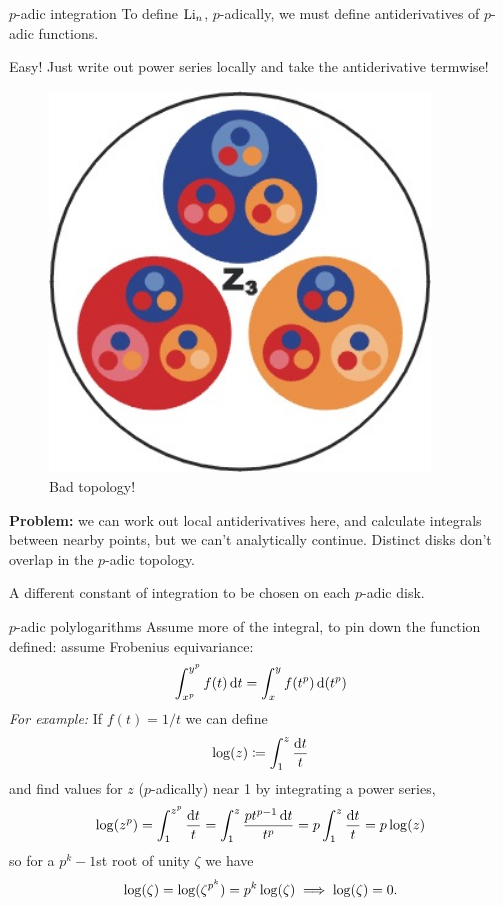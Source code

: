 \begin{frame}{$p$-adic integration}
    To define $\operatorname{Li}_n$, $p$-adically, we must define antiderivatives of $p$-adic functions.

    Easy! Just write out power series locally and take the antiderivative termwise!

    \begin{figure}
        \includegraphics[width=0.9\textwidth]{padic.jpg}
        \caption*{Bad topology!}
    \end{figure}
    \textbf{Problem:} we can work out local antiderivatives here, and calculate integrals between nearby points, but we can't analytically continue. Distinct disks don't overlap in the $p$-adic topology.
    
    A different constant of integration to be chosen on each $p$-adic disk.
\end{frame}


\begin{frame}{$p$-adic polylogarithms}
    Assume more of the integral, to pin down the function defined: assume Frobenius equivariance:
    \[\int_{x^p}^{y^p} f(t) \mathop{}\!\mathrm{d} t= \int_{x}^{y} f(t^p) \mathop{}\!\mathrm{d} (t^p) \]\pause
    \emph{For example:} If $f(t) = 1/t$ we can define 
    \[\log (z) \coloneqq \int_1^z\frac{ \mathop{}\!\mathrm{d} t}{t}\]
    and find values for $z$ ($p$-adically) near 1 by integrating a power series, 
    \[\log(z^p)= \int_{1}^{z^p} \frac{\mathop{}\!\mathrm{d} t}{t} = \int_{1}^{z} \frac{pt^{p-1}\mathop{}\!\mathrm{d} t}{t^p} 
    = p\int_{1}^{z} \frac{\mathop{}\!\mathrm{d} t}{t} = p\log(z)\]
    so for a $p^k-1$st root of unity $\zeta $ we have\[\log(\zeta ) = \log(\zeta ^{p^k}) = p^k \log(\zeta ) \implies \log(\zeta )= 0\text.\]
\end{frame}

